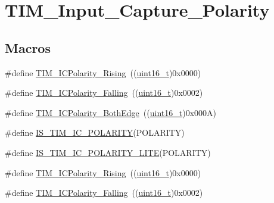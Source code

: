 \hypertarget{group___t_i_m___input___capture___polarity}{}\section{T\+I\+M\+\_\+\+Input\+\_\+\+Capture\+\_\+\+Polarity}
\label{group___t_i_m___input___capture___polarity}
\subsection*{Macros}
\begin{DoxyCompactItemize}
\item 
\#define \hyperlink{group___t_i_m___input___capture___polarity_gabe598596b7dbcac446a4918105fa95a6}{T\+I\+M\+\_\+\+I\+C\+Polarity\+\_\+\+Rising}~((\hyperlink{_p_e___types_8h_a1f1825b69244eb3ad2c7165ddc99c956}{uint16\+\_\+t})0x0000)
\item 
\#define \hyperlink{group___t_i_m___input___capture___polarity_ga70c6f5ed30a236bac4c690928e742243}{T\+I\+M\+\_\+\+I\+C\+Polarity\+\_\+\+Falling}~((\hyperlink{_p_e___types_8h_a1f1825b69244eb3ad2c7165ddc99c956}{uint16\+\_\+t})0x0002)
\item 
\#define \hyperlink{group___t_i_m___input___capture___polarity_ga4632a6425d407c0d28b610b2d31cccc8}{T\+I\+M\+\_\+\+I\+C\+Polarity\+\_\+\+Both\+Edge}~((\hyperlink{_p_e___types_8h_a1f1825b69244eb3ad2c7165ddc99c956}{uint16\+\_\+t})0x000\+A)
\item 
\#define \hyperlink{group___t_i_m___input___capture___polarity_ga6aff2fe442fd9662a0bb8731134cda89}{I\+S\+\_\+\+T\+I\+M\+\_\+\+I\+C\+\_\+\+P\+O\+L\+A\+R\+I\+TY}(P\+O\+L\+A\+R\+I\+TY)
\item 
\#define \hyperlink{group___t_i_m___input___capture___polarity_gaaae722dd6c33a224df267c703824b94c}{I\+S\+\_\+\+T\+I\+M\+\_\+\+I\+C\+\_\+\+P\+O\+L\+A\+R\+I\+T\+Y\+\_\+\+L\+I\+TE}(P\+O\+L\+A\+R\+I\+TY)
\item 
\#define \hyperlink{group___t_i_m___input___capture___polarity_gabe598596b7dbcac446a4918105fa95a6}{T\+I\+M\+\_\+\+I\+C\+Polarity\+\_\+\+Rising}~((\hyperlink{_p_e___types_8h_a1f1825b69244eb3ad2c7165ddc99c956}{uint16\+\_\+t})0x0000)
\item 
\#define \hyperlink{group___t_i_m___input___capture___polarity_ga70c6f5ed30a236bac4c690928e742243}{T\+I\+M\+\_\+\+I\+C\+Polarity\+\_\+\+Falling}~((\hyperlink{_p_e___types_8h_a1f1825b69244eb3ad2c7165ddc99c956}{uint16\+\_\+t})0x0002)
\item 

\end{DoxyCompactItemize}
